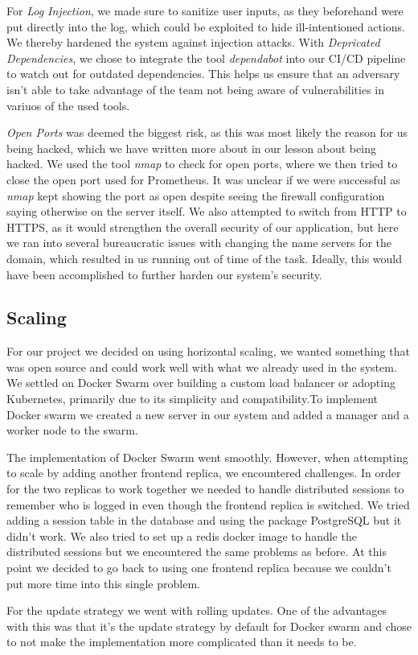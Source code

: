 For \textit{Log Injection}, we made sure to sanitize user inputs, as they beforehand were put directly into the log, which could be exploited to hide ill-intentioned actions. We thereby hardened the system against injection attacks.
With \textit{Depricated Dependencies}, we chose to integrate the tool \textit{dependabot} into our CI/CD pipeline to watch out for outdated dependencies. This helps us ensure that an adversary isn't able to take advantage of the team not being aware of vulnerabilities in variuos of the used tools.

\textit{Open Ports} was deemed the biggest risk, as this was most likely the reason for us being hacked, which we have written more about in our lesson about being hacked. We used the tool \textit{nmap} to check for open ports, where we then tried to close the open port used for Prometheus. It was unclear if we were successful as \textit{nmap} kept showing the port as open despite seeing the firewall configuration saying otherwise on the server itself.
We also attempted to switch from HTTP to HTTPS, as it would strengthen the overall security of our application, but here we ran into several bureaucratic issues with changing the name servers for the domain, which resulted in us running out of time of the task. Ideally, this would have been accomplished to further harden our system's security.

\subsection{Scaling}
For our project we decided on using horizontal scaling, we wanted something that was open source and could work well with what we already used in the system. We settled on Docker Swarm over building a custom load balancer or adopting Kubernetes, primarily due to its simplicity and compatibility.To implement Docker swarm we created a new server in our system and added a manager and a worker node to the swarm.

The implementation of Docker Swarm went smoothly. However, when attempting to scale by adding another frontend replica, we encountered challenges. In order for the two replicas to work together we needed to handle distributed sessions to remember who is logged in even though the frontend replica is switched. We tried adding a session table in the database and using the package PostgreSQL but it didn’t work. We also tried to set up a redis docker image to handle the distributed sessions but we encountered the same problems as before. At this point we decided to go back to using one frontend replica because we couldn’t put more time into this single problem.

For the update strategy we went with rolling updates. One of the advantages with this was that it’s the update strategy by default for Docker swarm and chose to not make the implementation more complicated than it needs to be.
